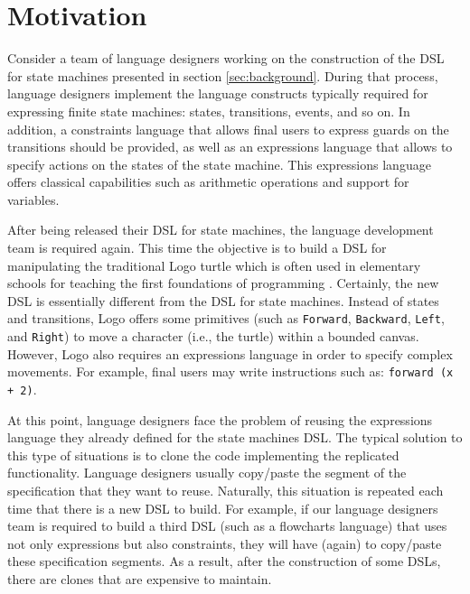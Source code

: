 \section{Motivation}
\label{sec:motivation}

Consider a team of language designers working on the construction of the DSL for state machines presented in section \ref{sec:background}. During that process, language designers implement the language constructs typically required for expressing finite state machines: states, transitions, events, and so on. In addition, a constraints language that allows final users to express guards on the transitions should be provided, as well as an expressions language that allows to specify actions on the states of the state machine. This expressions language offers classical capabilities such as arithmetic operations and support for variables.

After being released their DSL for state machines, the language development team is required again. This time the objective is to build a DSL for manipulating the traditional Logo turtle which is often used in elementary schools for teaching the first foundations of programming \cite{Olson:1987}. Certainly, the new DSL is essentially different from the DSL for state machines. Instead of states and transitions, Logo offers some primitives (such as \texttt{Forward}, \texttt{Backward}, \texttt{Left}, and \texttt{Right}) to move a character (i.e., the turtle) within a bounded canvas. However, Logo also requires an expressions language in order to specify complex movements. For example, final users may write instructions such as: \texttt{forward (x + 2)}.

At this point, language designers face the problem of reusing the expressions language they already defined for the state machines DSL. The typical solution to this type of situations is to clone the code implementing the replicated functionality. Language designers usually copy/paste the segment of the specification that they want to reuse. Naturally, this situation is repeated each time that there is a new DSL to build. For example, if our language designers team is required to build a third DSL (such as a flowcharts language) that uses not only expressions but also constraints, they will have (again) to copy/paste these specification segments. As a result, after the construction of some DSLs, there are clones that are expensive to maintain.


